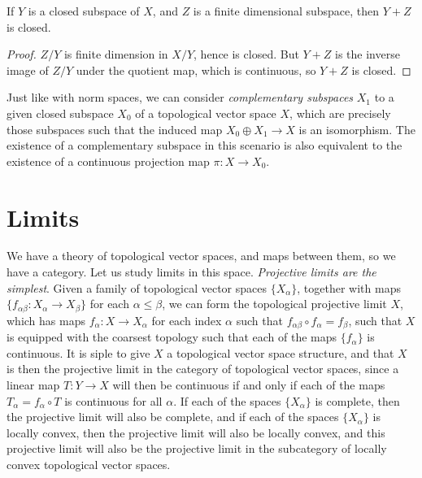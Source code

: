 \begin{corollary}
    If $Y$ is a closed subspace of $X$, and $Z$ is a finite dimensional subspace, then $Y + Z$ is closed.
\end{corollary}
\begin{proof}
    $Z/Y$ is finite dimension in $X/Y$, hence is closed. But $Y + Z$ is the inverse image of $Z/Y$ under the quotient map, which is continuous, so $Y + Z$ is closed.
\end{proof}

Just like with norm spaces, we can consider \emph{complementary subspaces} $X_1$ to a given closed subspace $X_0$ of a topological vector space $X$, which are precisely those subspaces such that the induced map $X_0 \oplus X_1 \to X$ is an isomorphism. The existence of a complementary subspace in this scenario is also equivalent to the existence of a continuous projection map $\pi: X \to X_0$.








\section{Limits}

We have a theory of topological vector spaces, and maps between them, so we have a category. Let us study  limits in this space. \emph{Projective limits are the simplest}. Given a family of topological vector spaces $\{ X_\alpha \}$, together with maps $\{ f_{\alpha \beta}: X_\alpha \to X_\beta \}$ for each $\alpha \leq \beta$, we can form the topological projective limit $X$, which has maps $f_\alpha: X \to X_\alpha$ for each index $\alpha$ such that $f_{\alpha \beta} \circ f_\alpha = f_\beta$, such that $X$ is equipped with the coarsest topology such that each of the maps $\{ f_\alpha \}$ is continuous. It is siple to give $X$ a topological vector space structure, and that $X$ is then the projective limit in the category of topological vector spaces, since a linear map $T: Y \to X$ will then be continuous if and only if each of the maps $T_\alpha = f_\alpha \circ T$ is continuous for all $\alpha$. If each of the spaces $\{ X_\alpha \}$ is complete, then the projective limit will also be complete, and if each of the spaces $\{ X_\alpha \}$ is locally convex, then the projective limit will also be locally convex, and this projective limit will also be the projective limit in the subcategory of locally convex topological vector spaces.

